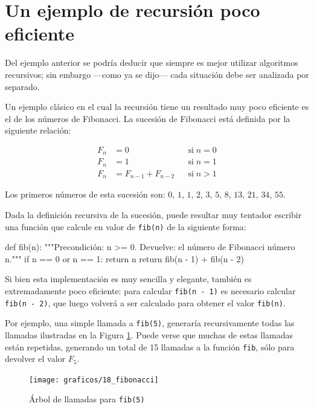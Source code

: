 \section{Un ejemplo de recursión poco eficiente}

Del ejemplo anterior se podría deducir que siempre es mejor utilizar algoritmos
recursivos; sin embargo ---como ya se dijo--- cada situación debe ser analizada por
separado.

Un ejemplo clásico en el cual la recursión tiene un resultado muy poco
eficiente es el de los números de Fibonacci.  La sucesión de Fibonacci está
definida por la siguiente relación:

\begin{align*}
F_n &= 0 &&\text{si}\;n = 0\\
F_n &= 1 &&\text{si}\;n = 1\\
F_n &= F_{n - 1} + F_{n - 2} &&\text{si}\;n > 1
\end{align*}

Los primeros números de esta sucesión son: $0$, $1$, $1$, $2$, $3$, $5$, $8$,
$13$, $21$, $34$, $55$.

Dada la definición recursiva de la sucesión, puede resultar muy tentador
escribir una función que calcule en valor de \lstinline!fib(n)! de la siguiente
forma:

\begin{codigo-python-sn}
def fib(n):
    """Precondición: n >= 0.
       Devuelve: el número de Fibonacci número n."""
    if n == 0 or n == 1:
        return n
    return fib(n - 1) + fib(n - 2)
\end{codigo-python-sn}

Si bien esta implementación es muy sencilla y elegante, también es extremadamente
poco eficiente: para calcular \lstinline!fib(n - 1)! es necesario calcular
\lstinline!fib(n - 2)!, que luego volverá a ser calculado para obtener el valor
\lstinline!fib(n)!.

Por ejemplo, una simple llamada a \lstinline!fib(5)!, generaría
recursivamente todas las llamadas ilustradas en la Figura \ref{fibonacci}.
Puede verse que muchas de estas llamadas están repetidas, generando un
total de 15 llamadas a la función \lstinline!fib!, sólo para devolver el
valor $F_5$.

\begin{figure}[htb]
\texttt{[image: graficos/18\_fibonacci]}
\caption{Árbol de llamadas para \lstinline!fib(5)!}
\label{fibonacci}
\end{figure}

